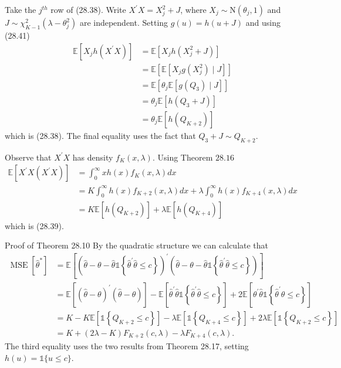 \documentclass[10pt]{article}
\begin{document}
Take the $j^{t h}$ row of (28.38). Write $X^{\prime} X=X_{j}^{2}+J$, where $X_{j} \sim \mathrm{N}\left(\theta_{j}, 1\right)$ and $J \sim \chi_{K-1}^{2}\left(\lambda-\theta_{j}^{2}\right)$ are independent. Setting $g(u)=h(u+J)$ and using (28.41)
$$
\begin{aligned}
\mathbb{E}\left[X_{j} h\left(X^{\prime} X\right)\right] &=\mathbb{E}\left[X_{j} h\left(X_{j}^{2}+J\right)\right] \\
&=\mathbb{E}\left[\mathbb{E}\left[X_{j} g\left(X_{j}^{2}\right) \mid J\right]\right] \\
&=\mathbb{E}\left[\theta_{j} \mathbb{E}\left[g\left(Q_{3}\right) \mid J\right]\right] \\
&=\theta_{j} \mathbb{E}\left[h\left(Q_{3}+J\right)\right] \\
&=\theta_{j} \mathbb{E}\left[h\left(Q_{K+2}\right)\right]
\end{aligned}
$$
which is (28.38). The final equality uses the fact that $Q_{3}+J \sim Q_{K+2}$.

Observe that $X^{\prime} X$ has density $f_{K}(x, \lambda)$. Using Theorem $28.16$
$$
\begin{aligned}
\mathbb{E}\left[X^{\prime} X\left(X^{\prime} X\right)\right] &=\int_{0}^{\infty} x h(x) f_{K}(x, \lambda) d x \\
&=K \int_{0}^{\infty} h(x) f_{K+2}(x, \lambda) d x+\lambda \int_{0}^{\infty} h(x) f_{K+4}(x, \lambda) d x \\
&=K \mathbb{E}\left[h\left(Q_{K+2}\right)\right]+\lambda \mathbb{E}\left[h\left(Q_{K+4}\right)\right]
\end{aligned}
$$
which is (28.39).

Proof of Theorem 28.10 By the quadratic structure we can calculate that
$$
\begin{aligned}
\operatorname{MSE}\left[\widehat{\theta}^{*}\right] &=\mathbb{E}\left[\left(\widehat{\theta}-\theta-\widehat{\theta} \mathbb{1}\left\{\widehat{\theta}^{\prime} \hat{\theta} \leq c\right\}\right)^{\prime}\left(\widehat{\theta}-\theta-\widehat{\theta} \mathbb{1}\left\{\widehat{\theta}^{\prime} \widehat{\theta} \leq c\right\}\right)\right] \\
&=\mathbb{E}\left[(\widehat{\theta}-\theta)^{\prime}(\widehat{\theta}-\theta)\right]-\mathbb{E}\left[\widehat{\theta}^{\prime} \widehat{\theta} \mathbb{1}\left\{\widehat{\theta}^{\prime} \widehat{\theta} \leq c\right\}\right]+2 \mathbb{E}\left[\theta^{\prime} \widehat{\theta} \mathbb{1}\left\{\widehat{\theta}^{\prime} \widehat{\theta} \leq c\right\}\right] \\
&=K-K \mathbb{E}\left[\mathbb{1}\left\{Q_{K+2} \leq c\right\}\right]-\lambda \mathbb{E}\left[\mathbb{1}\left\{Q_{K+4} \leq c\right\}\right]+2 \lambda \mathbb{E}\left[\mathbb{1}\left\{Q_{K+2} \leq c\right\}\right] \\
&=K+(2 \lambda-K) F_{K+2}(c, \lambda)-\lambda F_{K+4}(c, \lambda) .
\end{aligned}
$$
The third equality uses the two results from Theorem 28.17, setting $h(u)=\mathbb{1}\{u \leq c\}$.
\end{document}

